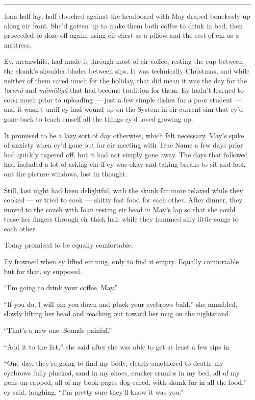 \begin{center}\rule{0.5\linewidth}{0.5pt}\end{center}

Ioan half lay, half slouched against the headboard with May draped bonelessly up along eir front. She'd gotten up to make them both coffee to drink in bed, then proceeded to doze off again, using eir chest as a pillow and the rest of em as a mattress.

Ey, meanwhile, had made it through most of eir coffee, resting the cup between the skunk's shoulder blades between sips. It was technically Christmas, and while neither of them cared much for the holiday, that did mean it was the day for the \emph{tocană} and \emph{mămăligă} that had become tradition for them. Ey hadn't learned to cook much prior to uploading — just a few simple dishes for a poor student — and it wasn't until ey had wound up on the System in eir current sim that ey'd gone back to teach emself all the things ey'd loved growing up.

It promised to be a lazy sort of day otherwise, which felt necessary. May's spike of anxiety when ey'd gone out for eir meeting with True Name a few days prior had quickly tapered off, but it had not simply gone away. The days that followed had included a lot of asking em if ey was okay and taking breaks to sit and look out the picture windows, lost in thought.

Still, last night had been delightful, with the skunk far more relaxed while they cooked — or tried to cook — shitty fast food for each other. After dinner, they moved to the couch with Ioan resting eir head in May's lap so that she could tease her fingers through eir thick hair while they hummed silly little songs to each other.

Today promised to be equally comfortable.

Ey frowned when ey lifted eir mug, only to find it empty. Equally comfortable but for that, ey supposed.

``I'm going to drink your coffee, May.''

``If you do, I will pin you down and pluck your eyebrows bald,'' she mumbled, slowly lifting her head and reaching out toward her mug on the nightstand.

``That's a new one. Sounds painful.''

``Add it to the list,'' she said after she was able to get at least a few sips in.

``One day, they're going to find my body, clearly smothered to death, my eyebrows fully plucked, sand in my shoes, cracker crumbs in my bed, all of my pens un-capped, all of my book pages dog-eared, with skunk fur in all the food,'' ey said, laughing. ``I'm pretty sure they'll know it was you.''

